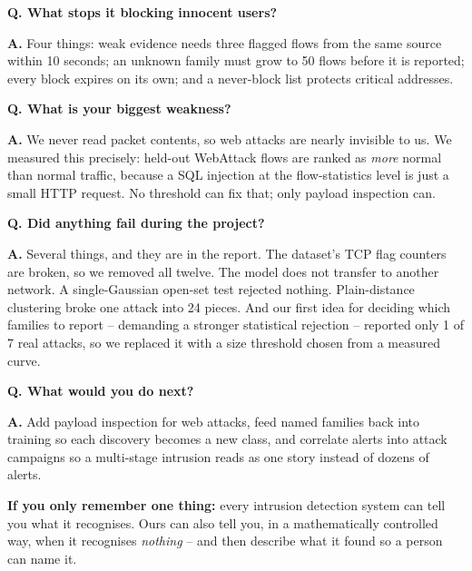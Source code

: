 \documentclass[11pt,a4paper]{article}
\newcommand{\qa}[2]{\par\medskip\noindent\textbf{Q. #1}\par\nobreak\vspace{1pt}\textbf{\color{good}A.} #2\par}
\begin{document}
\qa{What stops it blocking innocent users?}
{Four things: weak evidence needs three flagged flows from the same source within
10 seconds; an unknown family must grow to 50 flows before it is reported; every
block expires on its own; and a never-block list protects critical addresses.}

\qa{What is your biggest weakness?}
{We never read packet contents, so web attacks are nearly invisible to us. We
measured this precisely: held-out WebAttack flows are ranked as \emph{more} normal
than normal traffic, because a SQL injection at the flow-statistics level is just
a small HTTP request. No threshold can fix that; only payload inspection can.}

\qa{Did anything fail during the project?}
{Several things, and they are in the report. The dataset's TCP flag counters are
broken, so we removed all twelve. The model does not transfer to another network.
A single-Gaussian open-set test rejected nothing. Plain-distance clustering broke
one attack into 24 pieces. And our first idea for deciding which families to
report -- demanding a stronger statistical rejection -- reported only 1 of 7 real
attacks, so we replaced it with a size threshold chosen from a measured curve.}

\qa{What would you do next?}
{Add payload inspection for web attacks, feed named families back into training so
each discovery becomes a new class, and correlate alerts into attack campaigns so
a multi-stage intrusion reads as one story instead of dozens of alerts.}

\vfill
\begin{saybox}
\textbf{If you only remember one thing:} every intrusion detection system can tell
you what it recognises. Ours can also tell you, in a mathematically controlled
way, when it recognises \emph{nothing} -- and then describe what it found so a
person can name it.
\end{saybox}
\end{document}
